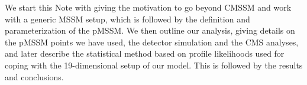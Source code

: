 We start this Note with giving the motivation to go beyond CMSSM and work with 
a generic MSSM setup, which is followed by the definition and parameterization 
of the pMSSM. We then outline our analysis, giving details on the pMSSM points we have used, the detector simulation and the CMS analyses, and later describe the statistical method based on profile likelihoods used for coping with the 19-dimensional setup 
of our model. This is followed by the results and conclusions.

